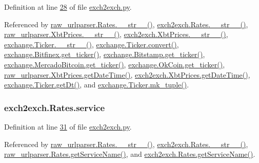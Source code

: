 Definition at line \hyperlink{exch2exch_8py_source_l00028}{28} of file \hyperlink{exch2exch_8py_source}{exch2exch.\+py}.



Referenced by \hyperlink{raw__urlparser_8py_source_l00038}{raw\+\_\+urlparser.\+Rates.\+\_\+\+\_\+str\+\_\+\+\_\+()}, \hyperlink{exch2exch_8py_source_l00042}{exch2exch.\+Rates.\+\_\+\+\_\+str\+\_\+\+\_\+()}, \hyperlink{raw__urlparser_8py_source_l00074}{raw\+\_\+urlparser.\+Xbt\+Prices.\+\_\+\+\_\+str\+\_\+\+\_\+()}, \hyperlink{exch2exch_8py_source_l00091}{exch2exch.\+Xbt\+Prices.\+\_\+\+\_\+str\+\_\+\+\_\+()}, \hyperlink{exchange_8py_source_l00111}{exchange.\+Ticker.\+\_\+\+\_\+str\+\_\+\+\_\+()}, \hyperlink{exchange_8py_source_l00065}{exchange.\+Ticker.\+convert()}, \hyperlink{exchange_8py_source_l00340}{exchange.\+Bitfinex.\+get\+\_\+ticker()}, \hyperlink{exchange_8py_source_l00409}{exchange.\+Bitstamp.\+get\+\_\+ticker()}, \hyperlink{exchange_8py_source_l00543}{exchange.\+Mercado\+Bitcoin.\+get\+\_\+ticker()}, \hyperlink{exchange_8py_source_l00608}{exchange.\+Ok\+Coin.\+get\+\_\+ticker()}, \hyperlink{raw__urlparser_8py_source_l00059}{raw\+\_\+urlparser.\+Xbt\+Prices.\+get\+Date\+Time()}, \hyperlink{exch2exch_8py_source_l00067}{exch2exch.\+Xbt\+Prices.\+get\+Date\+Time()}, \hyperlink{exchange_8py_source_l00093}{exchange.\+Ticker.\+get\+Dt()}, and \hyperlink{exchange_8py_source_l00096}{exchange.\+Ticker.\+mk\+\_\+tuple()}.

\subsubsection[{\texorpdfstring{service}{service}}]{\setlength{\rightskip}{0pt plus 5cm}exch2exch.\+Rates.\+service}\hypertarget{classexch2exch_1_1_rates_a94c1394b9259d6a7c8f3c12bbd20e685}{}\label{classexch2exch_1_1_rates_a94c1394b9259d6a7c8f3c12bbd20e685}


Definition at line \hyperlink{exch2exch_8py_source_l00031}{31} of file \hyperlink{exch2exch_8py_source}{exch2exch.\+py}.



Referenced by \hyperlink{raw__urlparser_8py_source_l00038}{raw\+\_\+urlparser.\+Rates.\+\_\+\+\_\+str\+\_\+\+\_\+()}, \hyperlink{exch2exch_8py_source_l00042}{exch2exch.\+Rates.\+\_\+\+\_\+str\+\_\+\+\_\+()}, \hyperlink{raw__urlparser_8py_source_l00035}{raw\+\_\+urlparser.\+Rates.\+get\+Service\+Name()}, and \hyperlink{exch2exch_8py_source_l00039}{exch2exch.\+Rates.\+get\+Service\+Name()}.

